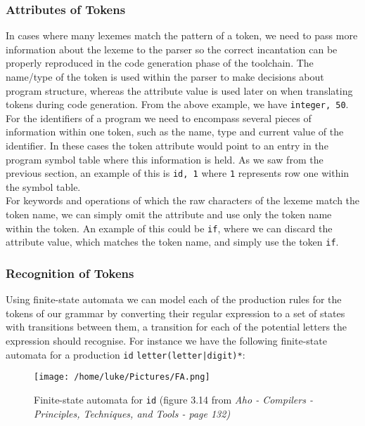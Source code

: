 \documentclass[a4paper, 11pt]{article}
\begin{document}
\subsubsection{Attributes of Tokens}
In cases where many lexemes match the pattern of a token, we need to pass more information about the lexeme to the parser so the correct incantation can be properly reproduced in the code generation phase of the toolchain. The name/type of the token is used within the parser to make decisions about program structure, whereas the attribute value is used later on when translating tokens during code generation. From the above example, we have \textlangle{}\texttt{integer, 50}\textrangle{}.
\\\newline
For the identifiers of a program we need to encompass several pieces of information within one token, such as the name, type and current value of the identifier. In these cases the token attribute would point to an entry in the program symbol table where this information is held. As we saw from the previous section, an example of this is \textlangle{}\texttt{id, 1}\textrangle{} where \texttt{1} represents row one within the symbol table.
\\\newline
For keywords and operations of which the raw characters of the lexeme match the token name, we can simply omit the attribute and use only the token name within the token. An example of this could be \texttt{if}, where we can discard the attribute value, which matches the token name, and simply use the token \textlangle{}\texttt{if}\textrangle{}.

\subsubsection{Recognition of Tokens}
Using finite-state automata we can model each of the production rules for the tokens of our grammar by converting their regular expression to a set of states with transitions between them, a transition for each of the potential letters the expression should recognise. For instance we have the following finite-state automata for a production \texttt{id} \textbf{\textrightarrow} \texttt{letter(letter|digit)*}:

\begin{figure}[H]
	\centering
	\texttt{[image: /home/luke/Pictures/FA.png]}
	\caption{Finite-state automata for \texttt{id} (figure 3.14 from \textit{Aho - Compilers - Principles, Techniques, and Tools - page 132)} \label{overflow}}
\end{figure}
\end{document}
